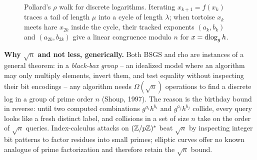 \begin{figure}[htbp]
\caption{Pollard's $\rho$ walk for discrete logarithms. Iterating $x_{k+1} = f(x_k)$ traces a tail of length $\mu$ into a cycle of length $\lambda$; when tortoise $x_k$ meets hare $x_{2k}$ inside the cycle, their tracked exponents $(a_k, b_k)$ and $(a_{2k}, b_{2k})$ give a linear congruence modulo $n$ for $x = \operatorname{dlog}_g h$.}
\label{ch20:fig-rho}
\end{figure}

\begin{whybox}
\textbf{Why $\sqrt{n}$ and not less, generically.} Both BSGS and rho are instances of a general
theorem: in a \emph{black-box group} -- an idealized model where an algorithm may only multiply elements, invert them, and test equality without inspecting their bit encodings -- any
algorithm needs $\Omega(\sqrt{n})$ operations to find a discrete log in a group of prime order $n$ (Shoup, 1997). The reason is
the birthday bound in reverse: until two computed combinations $g^{a_i} h^{b_i}$ and $g^{a_j} h^{b_j}$ collide, every query looks like a fresh distinct label, and collisions in a set of size $n$ take on the order of $\sqrt{n}$ queries. Index-calculus attacks on $(\mathbb{Z}/p\mathbb{Z})^{*}$ beat $\sqrt{n}$ by inspecting integer bit patterns to factor residues into small primes; elliptic curves offer no known analogue of prime factorization and therefore retain the $\sqrt{n}$ bound.
\end{whybox}

